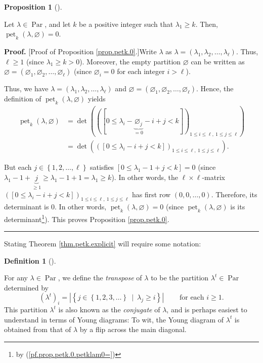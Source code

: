 \documentclass[numbers=enddot,12pt,final,onecolumn,notitlepage]{scrartcl}%
\theoremstyle{definition}
\newtheorem{prop}[theo]{Proposition}
\newenvironment{proposition}[1][]
{\begin{prop}[#1]\begin{leftbar}}
{\end{leftbar}\end{prop}}
\newtheorem{defi}[theo]{Definition}
\newenvironment{definition}[1][]
{\begin{defi}[#1]\begin{leftbar}}
{\end{leftbar}\end{defi}}
\newenvironment{proof}[1][Proof]{\noindent\textbf{#1.} }{\ \rule{0.5em}{0.5em}}
\begin{document}
\begin{proposition}
\label{prop.petk.0}Let $\lambda\in\operatorname*{Par}$, and let $k$ be a
positive integer such that $\lambda_{1}\geq k$. Then, $\operatorname*{pet}%
\nolimits_{k}\left(  \lambda,\varnothing\right)  =0$.
\end{proposition}

\begin{proof}
[Proof of Proposition \ref{prop.petk.0}.]Write $\lambda$ as $\lambda=\left(
\lambda_{1},\lambda_{2},\ldots,\lambda_{\ell}\right)  $. Thus, $\ell\geq1$
(since $\lambda_{1}\geq k>0$). Moreover, the empty partition $\varnothing$ can
be written as $\varnothing=\left(  \varnothing_{1},\varnothing_{2}%
,\ldots,\varnothing_{\ell}\right)  $ (since $\varnothing_{i}=0$ for each
integer $i>\ell$).

Thus, we have $\lambda=\left(  \lambda_{1},\lambda_{2},\ldots,\lambda_{\ell
}\right)  $ and $\varnothing=\left(  \varnothing_{1},\varnothing_{2}%
,\ldots,\varnothing_{\ell}\right)  $. Hence, the definition of
$\operatorname*{pet}\nolimits_{k}\left(  \lambda,\varnothing\right)  $ yields
\begin{align}
\operatorname*{pet}\nolimits_{k}\left(  \lambda,\varnothing\right)   &
=\det\left(  \left(  \left[  0\leq\lambda_{i}-\underbrace{\varnothing_{j}%
}_{=0}-i+j<k\right]  \right)  _{1\leq i\leq\ell,\ 1\leq j\leq\ell}\right)
\nonumber\\
&  =\det\left(  \left(  \left[  0\leq\lambda_{i}-i+j<k\right]  \right)
_{1\leq i\leq\ell,\ 1\leq j\leq\ell}\right)  .
\label{pf.prop.petk.0.petklam0=}%
\end{align}


But each $j\in\left\{  1,2,\ldots,\ell\right\}  $ satisfies $\left[
0\leq\lambda_{1}-1+j<k\right]  =0$ (since $\lambda_{1}-1+\underbrace{j}%
_{\geq1}\geq\lambda_{1}-1+1=\lambda_{1}\geq k$). In other words, the
$\ell\times\ell$-matrix $\left(  \left[  0\leq\lambda_{i}-i+j<k\right]
\right)  _{1\leq i\leq\ell,\ 1\leq j\leq\ell}$ has first row $\left(
0,0,\ldots,0\right)  $. Therefore, its determinant is $0$. In other words,
$\operatorname*{pet}\nolimits_{k}\left(  \lambda,\varnothing\right)  =0$
(since $\operatorname*{pet}\nolimits_{k}\left(  \lambda,\varnothing\right)  $
is its determinant\footnote{by (\ref{pf.prop.petk.0.petklam0=})}). This proves
Proposition \ref{prop.petk.0}.
\end{proof}

Stating Theorem \ref{thm.petk.explicit} will require some notation:

\begin{definition}
\label{def.transpose}For any $\lambda\in\operatorname*{Par}$, we define the
\emph{transpose} of $\lambda$ to be the partition $\lambda^{t}\in
\operatorname*{Par}$ determined by%
\[
\left(  \lambda^{t}\right)  _{i}=\left\vert \left\{  j\in\left\{
1,2,3,\ldots\right\}  \ \mid\ \lambda_{j}\geq i\right\}  \right\vert
\ \ \ \ \ \ \ \ \ \ \text{for each }i\geq1.
\]
This partition $\lambda^{t}$ is also known as the \emph{conjugate} of
$\lambda$, and is perhaps easiest to understand in terms of Young diagrams: To
wit, the Young diagram of $\lambda^{t}$ is obtained from that of $\lambda$ by
a flip across the main diagonal.
\end{definition}
\end{document}

